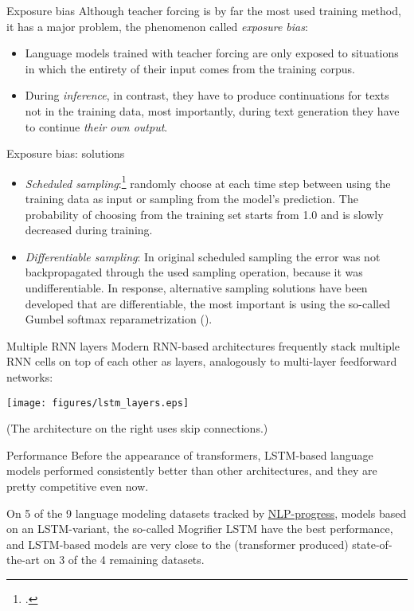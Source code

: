 \documentclass[style=upen, size=14pt]{powerdot}
\newcommand{\gold}{\color{arany}}
\theoremstyle{definition}
\begin{document}
\begin{slide}[toc=Exposure bias]{Exposure bias}
  Although teacher forcing is by far the most used training method, it has a
  major problem, the phenomenon called \emph{\gold exposure bias}:\bigskip
  \begin{itemize}
  \item Language models trained with teacher forcing are only exposed to
    situations in which the entirety of their input comes from the training
    corpus.
  \item During \emph{inference}, in contrast, they have to produce continuations
    for texts not in the training data, most importantly, during text generation
    they have to continue \emph{their own output}.
  \end{itemize}
\end{slide}

\begin{slide}[toc=]{Exposure bias: solutions}
  \begin{itemize}
  \item \emph{\gold Scheduled sampling}:\footnote{\cite{bengio2015scheduled}.}
    randomly choose at each time step between using the training data as input
    or sampling from the model's prediction. The probability of choosing from
    the training set starts from 1.0 and is slowly decreased during training.
  \item \emph{\gold Differentiable sampling}: In original scheduled sampling the
    error was not backpropagated through the used sampling operation, because it
    was undifferentiable. In response, alternative sampling solutions have been
    developed that are differentiable, the most important is using the so-called
    Gumbel softmax reparametrization (\cite{jang2016categorical}).
  \end{itemize}
\end{slide}

\begin{slide}{Multiple RNN layers}
  Modern RNN-based architectures frequently stack multiple RNN cells on top of
  each other as layers, analogously to multi-layer feedforward networks:
  \begin{center}
    \texttt{[image: figures/lstm\_layers.eps]}
  \end{center}
  (The architecture on the right uses skip connections.)
\end{slide}

\begin{slide}{Performance}
  Before the appearance of transformers, LSTM-based language models performed
  consistently better than other architectures, and they are pretty competitive
  even now.\bigskip

  On 5 of the 9 language modeling datasets tracked by
  \href{http://http://nlpprogress.com}{NLP-progress}, models based on an
  LSTM-variant, the so-called Mogrifier LSTM have the best performance, and
  LSTM-based models are very close to the (transformer produced)
  state-of-the-art on 3 of the 4 remaining datasets.
\end{slide}
\end{document}
